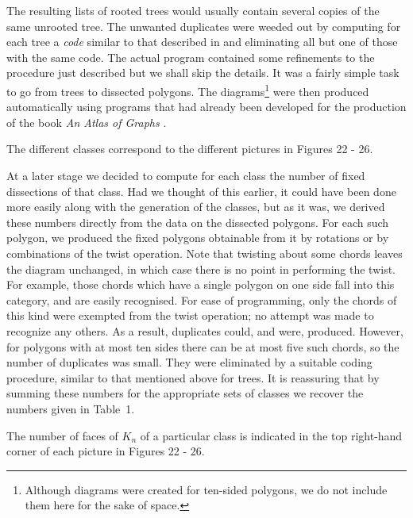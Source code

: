 \documentclass[10pt]{amsart}
\begin{document}
    The resulting lists of rooted trees would usually contain several copies of the same unrooted tree.   The unwanted duplicates were weeded out by computing for each tree a {\em code} similar to that described in \cite{r2} and eliminating all but one of those with the same code.   The actual program contained some refinements to the procedure just described but we shall skip the details. It was a fairly simple task to go from trees to dissected polygons.  The diagrams\footnote{Although diagrams were created for ten-sided polygons, we do not include them here for the sake of space.} were then produced automatically using programs that had already been developed for the production of the book {\em An Atlas of Graphs} \cite{rw}.
    
    \begin{prop}[Solution to {\em P2}\,]
    The different classes correspond to the different pictures in Figures 22 - 26.
    \end{prop}
    
    At a later stage we decided to compute for each class the number of fixed dissections of that class.   Had we thought of this earlier, it could have been done more easily along with the generation of the classes, but as it was, we derived these numbers directly from the data on the dissected polygons.   For each such polygon, we produced the fixed polygons obtainable from it by rotations or by combinations of the twist operation.   Note that twisting about some chords leaves the diagram unchanged, in which case there is no point in performing the twist.   For example, those chords which have a single polygon on one side fall into this category, and are easily recognised.   For ease of programming, only the chords of this kind were exempted from the twist operation; no attempt was made to recognize any others. As a result, duplicates could, and were, produced.   However, for polygons with at most ten sides there can be at most five such chords, so the number of duplicates was small.   They were eliminated by a suitable coding procedure, similar to that mentioned above for trees. It is reassuring that by summing these numbers for the appropriate sets of classes we recover the numbers given in Table~1.
    
    \begin{prop}[Solution to {\em P3}\,]
    The number of faces of $K_n$ of a particular class is indicated in the top right-hand corner of each picture in Figures 22 - 26.
    \label{p:cp3}
    \end{prop}
    
\end{document}
